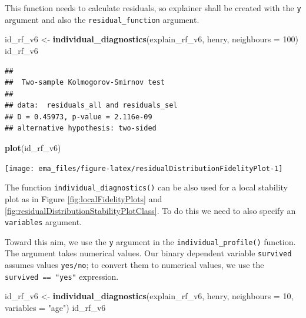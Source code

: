 \documentclass[]{krantz}
\newenvironment{Shaded}{\begin{snugshade}}{\end{snugshade}}
\newcommand{\DataTypeTok}[1]{\textcolor[rgb]{0.13,0.29,0.53}{#1}}
\newcommand{\DecValTok}[1]{\textcolor[rgb]{0.00,0.00,0.81}{#1}}
\newcommand{\KeywordTok}[1]{\textcolor[rgb]{0.13,0.29,0.53}{\textbf{#1}}}
\newcommand{\NormalTok}[1]{#1}
\newcommand{\StringTok}[1]{\textcolor[rgb]{0.31,0.60,0.02}{#1}}
\begin{document}
This function needs to calculate residuals, so explainer shall be created with the \texttt{y} argument and also the \texttt{residual\_function} argument.

\begin{Shaded}
\begin{Highlighting}[]
\NormalTok{id_rf_v6 <-}\StringTok{ }\KeywordTok{individual_diagnostics}\NormalTok{(explain_rf_v6,}
\NormalTok{                          henry,}
                          \DataTypeTok{neighbours =} \DecValTok{100}\NormalTok{)}
\NormalTok{id_rf_v6}
\end{Highlighting}
\end{Shaded}

\begin{verbatim}
## 
##  Two-sample Kolmogorov-Smirnov test
## 
## data:  residuals_all and residuals_sel
## D = 0.45973, p-value = 2.116e-09
## alternative hypothesis: two-sided
\end{verbatim}

\begin{Shaded}
\begin{Highlighting}[]
\KeywordTok{plot}\NormalTok{(id_rf_v6)}
\end{Highlighting}
\end{Shaded}

\begin{center}\texttt{[image: ema\_files/figure-latex/residualDistributionFidelityPlot-1]} \end{center}

The function \texttt{individual\_diagnostics()} can be also used for a local stability plot as in Figure \ref{fig:localFidelityPlots} and \ref{fig:residualDistributionStabilityPlotClass}. To do this we need to also specify an \texttt{variables} argument.

Toward this aim, we use the \texttt{y} argument in the \texttt{individual\_profile()} function. The argument takes numerical values. Our binary dependent variable \texttt{survived} assumes values \texttt{yes/no}; to convert them to numerical values, we use the \texttt{survived\ ==\ "yes"} expression.

\begin{Shaded}
\begin{Highlighting}[]
\NormalTok{id_rf_v6 <-}\StringTok{ }\KeywordTok{individual_diagnostics}\NormalTok{(explain_rf_v6,}
\NormalTok{                          henry, }
                       \DataTypeTok{neighbours =} \DecValTok{10}\NormalTok{,}
                       \DataTypeTok{variables =} \StringTok{"age"}\NormalTok{)}
\NormalTok{id_rf_v6}
\end{Highlighting}
\end{Shaded}
\end{document}
